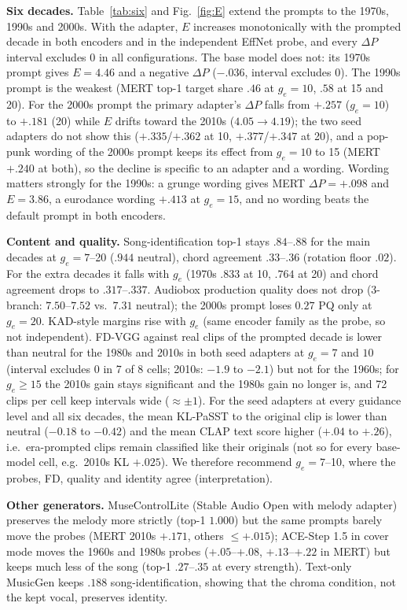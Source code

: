 \documentclass[10pt,twocolumn]{article}
\newcommand{\dP}{\Delta P}
\begin{document}
\textbf{Six decades.} Table~\ref{tab:six} and Fig.~\ref{fig:E} extend the prompts to the 1970s, 1990s and 2000s. With the adapter, $E$ increases monotonically with the prompted decade in both encoders and in the independent EffNet probe, and every $\dP$ interval excludes 0 in all configurations. The base model does not: its 1970s prompt gives $E{=}4.46$ and a negative $\dP$ ($-.036$, interval excludes 0). The 1990s prompt is the weakest (MERT top-1 target share $.46$ at $g_e{=}10$, $.58$ at 15 and 20). For the 2000s prompt the primary adapter's $\dP$ falls from $+.257$ ($g_e{=}10$) to $+.181$ (20) while $E$ drifts toward the 2010s ($4.05\to4.19$); the two seed adapters do not show this ($+.335$/$+.362$ at 10, $+.377$/$+.347$ at 20), and a pop-punk wording of the 2000s prompt keeps its effect from $g_e{=}10$ to 15 (MERT $+.240$ at both), so the decline is specific to an adapter and a wording. Wording matters strongly for the 1990s: a grunge wording gives MERT $\dP{=}+.098$ and $E{=}3.86$, a eurodance wording $+.413$ at $g_e{=}15$, and no wording beats the default prompt in both encoders.

\textbf{Content and quality.} Song-identification top-1 stays $.84$--$.88$ for the main decades at $g_e{=}7$--20 ($.944$ neutral), chord agreement $.33$--$.36$ (rotation floor $.02$). For the extra decades it falls with $g_e$ (1970s $.833$ at 10, $.764$ at 20) and chord agreement drops to $.317$--$.337$. Audiobox production quality does not drop (3-branch: $7.50$--$7.52$ vs.\ $7.31$ neutral); the 2000s prompt loses $0.27$ PQ only at $g_e{=}20$. KAD-style margins rise with $g_e$ (same encoder family as the probe, so not independent). FD-VGG against real clips of the prompted decade is lower than neutral for the 1980s and 2010s in both seed adapters at $g_e{=}7$ and $10$ (interval excludes 0 in 7 of 8 cells; 2010s: $-1.9$ to $-2.1$) but not for the 1960s; for $g_e\geq15$ the 2010s gain stays significant and the 1980s gain no longer is, and 72 clips per cell keep intervals wide ($\approx\pm1$). For the seed adapters at every guidance level and all six decades, the mean KL-PaSST to the original clip is lower than neutral ($-0.18$ to $-0.42$) and the mean CLAP text score higher ($+.04$ to $+.26$), i.e.\ era-prompted clips remain classified like their originals (not so for every base-model cell, e.g.\ 2010s KL $+.025$). We therefore recommend $g_e{=}7$--10, where the probes, FD, quality and identity agree (interpretation).

\textbf{Other generators.} MuseControlLite (Stable Audio Open with melody adapter) preserves the melody more strictly (top-1 $1.000$) but the same prompts barely move the probes (MERT 2010s $+.171$, others $\leq +.015$); ACE-Step 1.5 in cover mode moves the 1960s and 1980s probes ($+.05$--$+.08$, $+.13$--$+.22$ in MERT) but keeps much less of the song (top-1 $.27$--$.35$ at every strength). Text-only MusicGen keeps $.188$ song-identification, showing that the chroma condition, not the kept vocal, preserves identity.
\end{document}
